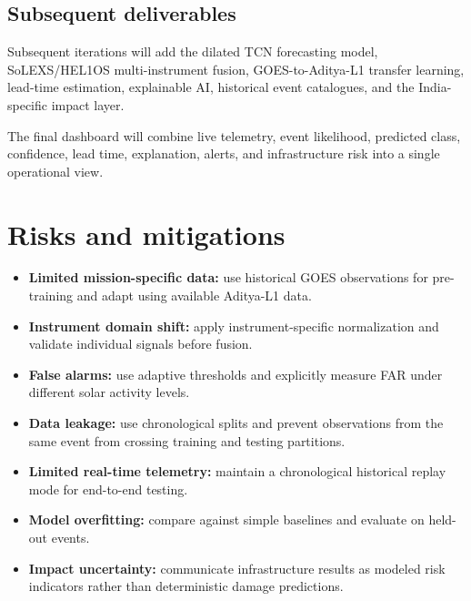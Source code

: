 \documentclass[10pt,a4paper]{article}
\begin{document}
\subsection{Subsequent deliverables}

Subsequent iterations will add the dilated TCN forecasting model, SoLEXS/HEL1OS
multi-instrument fusion, GOES-to-Aditya-L1 transfer learning, lead-time estimation,
explainable AI, historical event catalogues, and the India-specific impact layer.

The final dashboard will combine live telemetry, event likelihood, predicted class,
confidence, lead time, explanation, alerts, and infrastructure risk into a single
operational view.


\section{Risks and mitigations}

\begin{itemize}
    \item \textbf{Limited mission-specific data:} use historical GOES observations
    for pre-training and adapt using available Aditya-L1 data.
    
    \item \textbf{Instrument domain shift:} apply instrument-specific normalization
    and validate individual signals before fusion.
    
    \item \textbf{False alarms:} use adaptive thresholds and explicitly measure FAR
    under different solar activity levels.
    
    \item \textbf{Data leakage:} use chronological splits and prevent observations
    from the same event from crossing training and testing partitions.
    
    \item \textbf{Limited real-time telemetry:} maintain a chronological historical
    replay mode for end-to-end testing.
    
    \item \textbf{Model overfitting:} compare against simple baselines and evaluate
    on held-out events.
    
    \item \textbf{Impact uncertainty:} communicate infrastructure results as modeled
    risk indicators rather than deterministic damage predictions.
\end{itemize}
\end{document}
